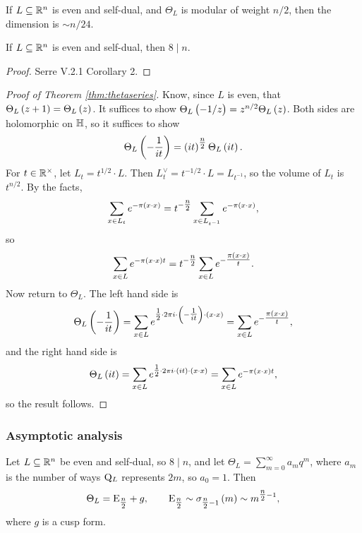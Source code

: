 If $ L \subseteq \mathbb{R}^n $ is even and self-dual, and $ \Theta_L $ is modular of weight $ n / 2 $, then the dimension is $ \sim n / 24 $.

\begin{fact*}
If $ L \subseteq \mathbb{R}^n $ is even and self-dual, then $ 8 \mid n $.
\end{fact*}

\begin{proof}
Serre V.2.1 Corollary 2.
\end{proof}

\pagebreak

\begin{proof}[Proof of Theorem \ref{thm:thetaseries}]
Know, since $ L $ is even, that $ \Theta_L\br{z + 1} = \Theta_L\br{z} $. It suffices to show $ \Theta_L\br{-1 / z} = z^{n / 2}\Theta_L\br{z} $. Both sides are holomorphic on $ \mathbb{H} $, so it suffices to show
$$ \Theta_L\br{-\dfrac{1}{it}} = \br{it}^{\tfrac{n}{2}}\Theta_L\br{it}. $$
For $ t \in \mathbb{R}^\times $, let $ L_t = t^{1 / 2} \cdot L $. Then $ L_t^\vee = t^{-1 / 2} \cdot L = L_{t^{-1}} $, so the volume of $ L_t $ is $ t^{n / 2} $. By the facts,
$$ \sum_{x \in L_t} e^{-\pi\br{x \cdot x}} = t^{-\tfrac{n}{2}}\sum_{x \in L_{t^{-1}}} e^{-\pi\br{x \cdot x}}, $$
so
$$ \sum_{x \in L} e^{-\pi\br{x \cdot x}t} = t^{-\tfrac{n}{2}}\sum_{x \in L} e^{-\tfrac{\pi\br{x \cdot x}}{t}}. $$
Now return to $ \Theta_L $. The left hand side is
$$ \Theta_L\br{-\dfrac{1}{it}} = \sum_{x \in L} e^{\tfrac{1}{2} \cdot 2\pi i \cdot \br{-\tfrac{1}{it}} \cdot \br{x \cdot x}} = \sum_{x \in L} e^{-\tfrac{\pi\br{x \cdot x}}{t}}, $$
and the right hand side is
$$ \Theta_L\br{it} = \sum_{x \in L} e^{\tfrac{1}{2} \cdot 2\pi i \cdot \br{it} \cdot \br{x \cdot x}} = \sum_{x \in L} e^{-\pi\br{x \cdot x}t}, $$
so the result follows.
\end{proof}

\subsubsection{Asymptotic analysis}

Let $ L \subseteq \mathbb{R}^n $ be even and self-dual, so $ 8 \mid n $, and let $ \Theta_L = \sum_{m = 0}^\infty a_mq^m $, where $ a_m $ is the number of ways $ \mathrm{Q}_L $ represents $ 2m $, so $ a_0 = 1 $. Then
$$ \Theta_L = \E_{\tfrac{n}{2}} + g, \qquad \E_{\tfrac{n}{2}} \sim \sigma_{\tfrac{n}{2} - 1}\br{m} \sim m^{\tfrac{n}{2} - 1}, $$
where $ g $ is a cusp form.


